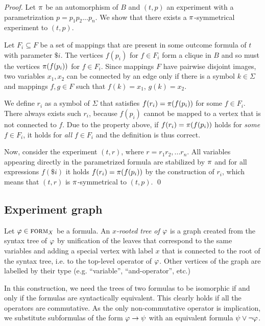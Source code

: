 \begin{proof}
Let $\pi$ be an automorphism of $B$ and $(t, p)$ an experiment with a parametrization $p=p_1p_2...p_n$.
We show that there exists a $\pi$-symmetrical experiment to $(t, p)$.

Let $F_i\subseteq F$ be a set of mappings that are present in some outcome formula
  of $t$ with parameter $\$i$.
The vertices $f(p_i)$ for $f\in F_i$ form a clique in $B$ and so must the vertices
$\pi(f(p_i))$ for $f\in F_i$.
Since mappings $F$ have pairwise disjoint images, two variables $x_1, x_2$
  can be connected by an edge only if there is a symbol $k\in\Sigma$ and
  mappings $f,g\in F$ such that $f(k)=x_1$, $g(k)=x_2$.

We define $r_i$ as a symbol of $\Sigma$ that satisfies $f(r_i) = \pi(f(p_i))$ for some $f\in F_i$.
There always exists such $r_i$, because $f(p_i)$ cannot be mapped to a vertex that is not connected to $f$.
Due to the property above,
  if $f(r_i) = \pi(f(p_i))$ holds
  for \emph{some} $f\in F_i$,
  it holds for \emph{all} $f\in F_i$ and the definition is thus correct.

Now, consider the experiment $(t, r)$, where $r=r_1r_2,...r_n$.
All variables appearing directly in the parametrized formula are stabilized by $\pi$ and
  for all expressions $f(\$i)$ it holds $f(r_i)=\pi(f(p_i))$ by the construction of $r_i$,
  which means that $(t, r)$ is $\pi$-symmetrical to $(t, p)$. \qed
\end{proof}

\subsection{Experiment graph}

Let $\varphi\in\textsc{form}_X$ be a formula.
An \emph{$x$-rooted tree of $\varphi$}
  is a graph created from the syntax tree of $\varphi$
  by unification of the leaves that correspond to the same variables
  and adding a special vertex with label $x$ that is connected to the root
  of the syntax tree, i.e. to the top-level operator of $\varphi$.
Other vertices of the graph are labelled by their type (e.g. ``variable'', ``and-operator'', etc.)

In this construction, we need the trees of two formulas to be isomorphic if
  and only if the formulas are syntactically equivalent.
This clearly holds if all the operators are commutative.
As the only non-commutative operator is implication, we substitute
subformulas of the form $\varphi -> \psi$ with an equivalent formula $\psi \vee \neg\varphi$.

